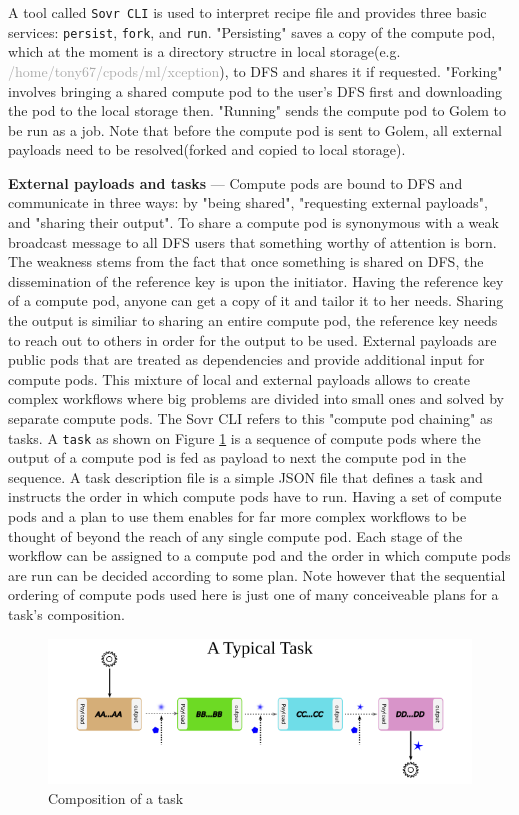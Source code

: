 \documentclass[a4paper, 10pt]{article}
\begin{document}
\par
A tool called \texttt{Sovr CLI} is used to interpret recipe file and provides three basic services: \texttt{persist}, \texttt{fork}, and \texttt{run}. "Persisting" saves a copy of the compute pod, which at the moment is a directory structre in local storage(e.g. \textcolor{darkgray}{/home/tony67/cpods/ml/xception}), to DFS and shares it if requested. "Forking" involves bringing a shared compute pod to the user's DFS first and downloading the pod to the local storage then. "Running" sends the compute pod to Golem to be run as a job. Note that before the compute pod is sent to Golem, all external payloads need to be resolved(forked and copied to local storage).
\par
\textbf{External payloads and tasks} --- Compute pods are bound to DFS and communicate in three ways: by "being shared", "requesting external payloads", and "sharing their output". To share a compute pod is synonymous with a weak broadcast message to all DFS users that something worthy of attention is born. The weakness stems from the fact that once something is shared on DFS, the dissemination of the reference key is upon the initiator. Having the reference key of a compute pod, anyone can get a copy of it and tailor it to her needs. Sharing the output is similiar to sharing an entire compute pod, the reference key needs to reach out to others in order for the output to be used. External payloads are public pods that are treated as dependencies and provide additional input for compute pods. This mixture of local and external payloads allows to create complex workflows where big problems are divided into small ones and solved by separate compute pods. The Sovr CLI refers to this "compute pod chaining" as tasks. A \texttt{task} as shown on Figure  \ref{task} is a sequence of compute pods where the output of a compute pod is fed as payload to next the compute pod in the sequence. A task description file is a simple JSON file that defines a task and instructs the order in which compute pods have to run. Having a set of compute pods and a plan to use them enables for far more complex workflows to be thought of beyond the reach of any single compute pod. Each stage of the workflow can be assigned to a compute pod and the order in which compute pods are run can be decided according to some plan. Note however that the sequential ordering of compute pods used here is just one of many conceiveable plans for a task's composition.
\begin{figure}
\includegraphics[scale=0.7,keepaspectratio=true]{images/task.png}
\caption{\label{task}Composition of a task}
\end{figure}
\end{document}
